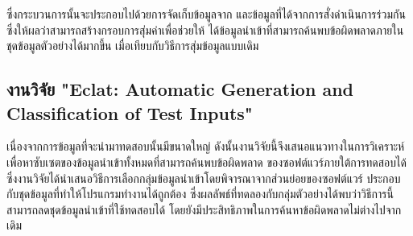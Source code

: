 ซึ่งกระบวนการนั้นจะประกอบไปด้วยการจัดเก็บข้อมูลจาก{\sourcecode} และข้อมูลที่ได้จากการสั่งดำเนินการร่วมกัน ซึ่งให้ผลว่าสามารถสร้างกรอบการสุ่มค่าเพื่อช่วยให้
ได้ข้อมูลนำเข้าที่สามารถค้นพบข้อผิดพลาดภายในชุดข้อมูลตัวอย่างได้มากขึ้น เมื่อเทียบกับวิธีการสุ่มข้อมูลแบบเดิม

\subsection{งานวิจัย "Eclat: Automatic Generation and Classification of Test Inputs" \cite{Heaton2000}}
\label{sec:sub:eclat}

เนื่องจากการข้อมูลที่จะนำมาทดสอบนั้นมีขนาดใหญ่ ดังนั้นงานวิจัยนี้จึงเสนอแนวทางในการวิเคราะห์เพื่อหาซับเซตของข้อมูลนำเข้าทั้งหมดที่สามารถค้นพบข้อผิดพลาด
ของซอฟต์แวร์ภายใต้การทดสอบได้ ซึ่งงานวิจัยได้นำเสนอวิธีการเลือกกลุ่มข้อมูลนำเข้าโดยพิจารณาจากส่วนย่อยของซอฟต์แวร์ 
ประกอบกับชุดข้อมูลที่ทำให้โปรแกรมทำงานได้ถูกต้อง ซึ่งผลลัพธ์ที่ทดลองกับกลุ่มตัวอย่างได้พบว่าวิธีการนี้สามารถลดชุดข้อมูลนำเข้าที่ใช้ทดสอบได้
โดยยังมีประสิทธิภาพในการค้นหาข้อผิดพลาดไม่ต่างไปจากเดิม

